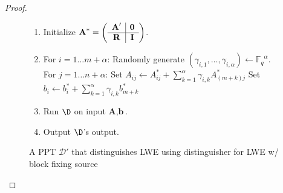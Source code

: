 \documentclass[11pt]{article}
\newcommand{\vect}[1]{\ensuremath{\textbf{#1}}}
\newcommand{\Fq}{\ensuremath{\mathbb{F}_q}}
\newcommand{\vA}{\vect{A}}
\newcommand{\vb}{\vect{b}}
\begin{document}
{\begin{proof}
\begin{figure}
\begin{enumerate}
\item Initialize $\vA^*  = \left(\begin{array}{c | c}\vA' & \mathbf{0}\\\hline \vect{R} & \vect{I}\end{array}\right)$.
\item \label{step:randomization}
For {$i=1\ldots m+\alpha$}:
\subitem Randomly generate $(\gamma_{i,1},\ldots, \gamma_{i,\alpha}) \leftarrow \Fq^\alpha$.
 \subitem For {$j = 1 \ldots n+\alpha$}:
\subsubitem Set $A_{ij} \leftarrow A^*_{ij}+\sum_{k=1}^\alpha \gamma_{i, k} A^*_{(m+k)j}$
\subsubitem Set $b_i \leftarrow b^*_i +  \sum_{k=1}^\alpha\gamma_{i, k} b^*_{m+k}$
\item Run $\D$ on input $\vA, \vb$.
\item Output $\D$'s output.
\end{enumerate}
\caption{A PPT $\mathcal{D'}$ that distinguishes LWE using distinguisher for LWE w/ block fixing source}
\label{fig:perfectLWEreduction}
\end{figure}


\end{proof}}
\end{document}

